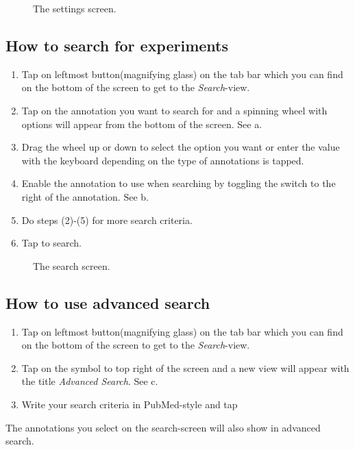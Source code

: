 \begin{figure}[htb]
\caption{The settings screen.}
\label{fig:ios_more}
\end{figure}
\FloatBarrier

\subsection{How to search for experiments}

\begin{enumerate}
\item Tap on leftmost button(magnifying glass) on the tab bar which you can find on the bottom of the screen to get to the \emph{Search}-view.
\item Tap on the annotation you want to search for and a spinning wheel with options will appear from the bottom of the screen. See a.
\item Drag the wheel up or down to select the option you want or enter the value with the keyboard depending on the type of annotations is tapped.
\item Enable the annotation to use when searching by toggling the switch to the right of the annotation. See b.
\item Do steps (2)-(5) for more search criteria.
\item Tap  to search.
\end{enumerate}

\begin{figure}[ht]
\caption{The search screen.}
\label{fig:ios_search}
\end{figure}
\FloatBarrier

\subsection{How to use advanced search}

\begin{enumerate}
\item Tap on leftmost button(magnifying glass) on the tab bar which you can find on the bottom of the screen to get to the \emph{Search}-view.
\item Tap on the symbol to top right of the screen and a new view will appear with the title \emph{Advanced Search}. See c.
\item Write your search criteria in PubMed-style and tap 
\end{enumerate}
The annotations you select on the search-screen will also show in advanced search.

